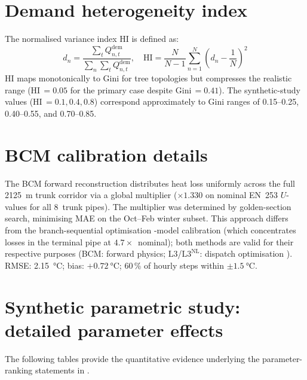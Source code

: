 \documentclass[a4paper,fleqn]{cas-dc}
\newcommand{\Lnl}{\mathrm{L3}^{\mathrm{NL}}}
\begin{document}
\bigskip

\section{Demand heterogeneity index}
\label{app:hi_definition}

The normalised variance index HI is defined as:
\begin{equation}
  d_n = \frac{\sum_t Q_{n,t}^{\mathrm{dem}}}{\sum_n \sum_t
    Q_{n,t}^{\mathrm{dem}}},
  \quad
  \mathrm{HI} = \frac{N}{N{-}1} \sum_{n=1}^{N}
    \left(d_n - \frac{1}{N}\right)^{\!2}
  \label{eq:hi}
\end{equation}
HI maps monotonically to Gini for tree topologies but compresses
the realistic range (HI\,$= 0.05$ for the primary case despite
Gini\,$= 0.41$).  The synthetic-study values
(HI\,$= 0.1, 0.4, 0.8$) correspond approximately to Gini ranges
of 0.15--0.25, 0.40--0.55, and 0.70--0.85.

\section{BCM calibration details}
\label{app:bcm_calibration}

The BCM forward reconstruction distributes heat loss uniformly
across the full \SI{2125}{\metre} trunk corridor via a global
multiplier (${\times}1.330$ on nominal EN~253 $U$-values for all
8~trunk pipes).  The multiplier was determined by golden-section
search, minimising MAE on the Oct--Feb winter subset.  This
approach differs from the branch-sequential optimisation -model
calibration (which concentrates losses in the terminal pipe at
$4.7{\times}$~nominal); both methods are valid for their
respective purposes (BCM: forward physics; L3/$\Lnl$: dispatch
optimisation ).  RMSE: \SI{2.15}{\celsius}; bias:
${+}\SI{0.72}{\celsius}$; 60\,\% of hourly steps within
${\pm}\SI{1.5}{\celsius}$.

\section{Synthetic parametric study: detailed parameter effects}
\label{app:synth_detail}

The following tables provide the quantitative evidence underlying
the parameter-ranking statements in
.
\end{document}
